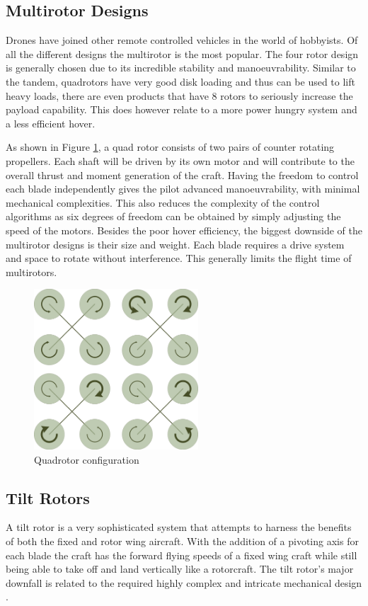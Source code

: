 \subsection{Multirotor Designs}
Drones have joined other remote controlled vehicles in the world of hobbyists. Of all the different designs the multirotor is the most popular. The four rotor design is generally chosen due to its incredible stability and manoeuvrability. Similar to the tandem, quadrotors have very good disk loading and thus can be used to lift heavy loads, there are even products that have 8 rotors to seriously increase the payload capability. This does however relate to a more power hungry system and a less efficient hover.

As shown in Figure \ref{IM_CounterBlades}, a quad rotor consists of two pairs of counter rotating propellers. Each shaft will be driven by its own motor and will contribute to the overall thrust and moment generation of the craft. Having the freedom to control each blade independently gives the pilot advanced manoeuvrability, with minimal mechanical complexities. This also reduces the complexity of the control algorithms as six degrees of freedom can be obtained by simply adjusting the speed of the motors. Besides the poor hover efficiency, the biggest downside of the multirotor designs is their size and weight. Each blade requires a drive system and space to rotate without interference. This generally limits the flight time of multirotors.

\begin{figure}[H]
	\centering
	\includegraphics[height =6cm]{Images/Literature/quadrotor}
	\caption{Quadrotor configuration \cite{ThrustCritical}}
	\label{IM_CounterBlades}
\end{figure}

\subsection{Tilt Rotors}
A tilt rotor is a very sophisticated system that attempts to harness the benefits of both the fixed and rotor wing aircraft. With the addition of a pivoting axis for each blade the craft has the forward flying speeds of a fixed wing craft while still being able to take off and land vertically like a rotorcraft. The tilt rotor's major downfall is related to the required highly complex and intricate mechanical design \cite{RotorConfig}.

